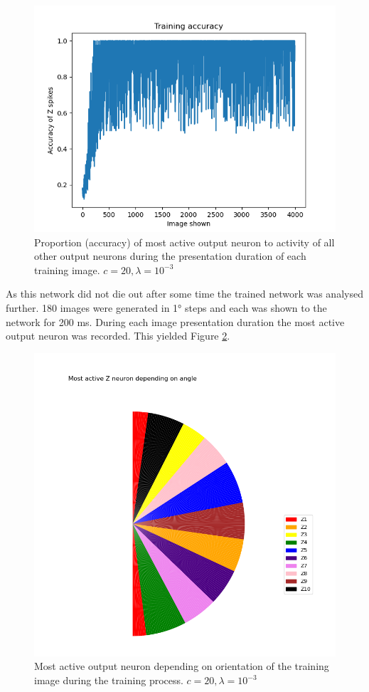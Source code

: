 \begin{figure}
  \includegraphics[width=\linewidth]{figures/angleNetwork/c20_3averageZ.png}
  \caption{Proportion (accuracy) of most active output neuron  to activity of all other output neurons during the presentation duration of each training image. $c = 20, \lambda = 10^{-3}$}
  \label{fig:c20_3averageZ}
\end{figure}

As this network did not die out after some time the trained network was analysed further. 180 images were generated in 1° steps and each was shown to the network for 200 ms. During each image presentation duration the most active output neuron was recorded. This yielded Figure \ref{fig:c20_3Pie}.

\begin{figure}
  \includegraphics[width=\linewidth]{figures/angleNetwork/c20_3validationPie.png}
  \caption{Most active output neuron depending on orientation of the training image during the training process. $c = 20, \lambda = 10^{-3}$}
  \label{fig:c20_3Pie}
\end{figure}


